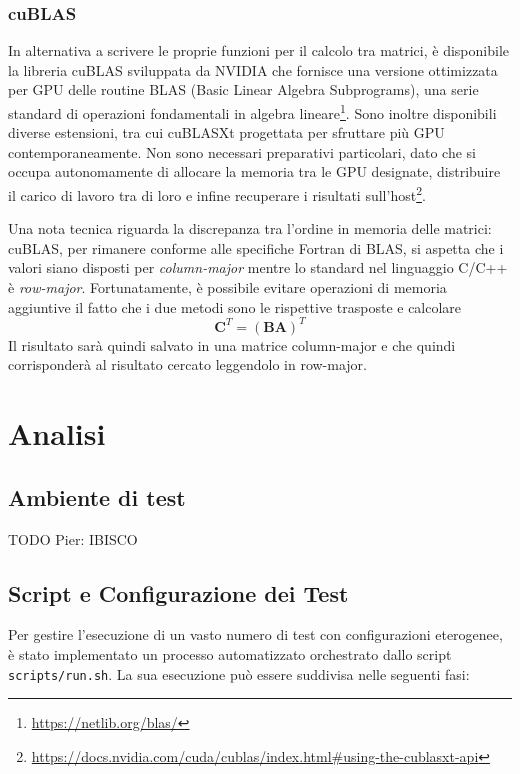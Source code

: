 \documentclass[a4paper]{article}
\begin{document}
\subsubsection{cuBLAS}
In alternativa a scrivere le proprie funzioni per il calcolo tra matrici, è disponibile la libreria cuBLAS sviluppata da NVIDIA che fornisce una versione ottimizzata per GPU delle routine BLAS (Basic Linear Algebra Subprograms), una serie standard di operazioni fondamentali in algebra lineare\footnote{\url{https://netlib.org/blas/}}. Sono inoltre disponibili diverse estensioni, tra cui cuBLASXt progettata per sfruttare più GPU contemporaneamente. Non sono necessari preparativi particolari, dato che si occupa autonomamente di allocare la memoria tra le GPU designate, distribuire il carico di lavoro tra di loro e infine recuperare i risultati sull'host\footnote{\url{https://docs.nvidia.com/cuda/cublas/index.html\#using-the-cublasxt-api}}.

Una nota tecnica riguarda la discrepanza tra l'ordine in memoria delle matrici: cuBLAS, per rimanere conforme alle specifiche Fortran di BLAS, si aspetta che i valori siano disposti per \textit{column-major} mentre lo standard nel linguaggio C/C++ è \textit{row-major}. Fortunatamente, è possibile evitare operazioni di memoria aggiuntive il fatto che i due metodi sono le rispettive trasposte e calcolare
$$
    \mathbf{C}^T=(\mathbf{B}\mathbf{A})^T
$$
Il risultato sarà quindi salvato in una matrice column-major e che quindi corrisponderà al risultato cercato leggendolo in row-major.

\section{Analisi}

\subsection{Ambiente di test}

TODO Pier: IBISCO

\subsection{Script e Configurazione dei Test}

Per gestire l'esecuzione di un vasto numero di test con configurazioni eterogenee, è stato implementato un processo automatizzato orchestrato dallo script \texttt{scripts/run.sh}. La sua esecuzione può essere suddivisa nelle seguenti fasi:
\end{document}
